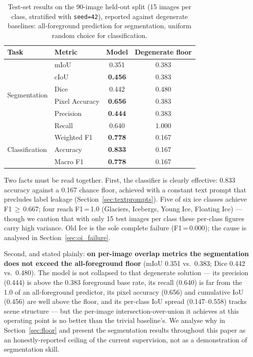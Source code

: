 \documentclass[remotesensing,article,accept,moreauthors,pdftex]{Definitions/mdpi}
\begin{document}
\begin{table}[H]
\centering
\caption{Test-set results on the 90-image held-out split
         (15 images per class, stratified with \texttt{seed=42}), reported
         against degenerate baselines: all-foreground prediction for
         segmentation, uniform random choice for classification.}
\label{tab:main_results}
\begin{tabular}{llcc}
\toprule
\textbf{Task} & \textbf{Metric} & \textbf{Model} & \textbf{Degenerate floor} \\
\midrule
\multirow{6}{*}{Segmentation}
  & mIoU           & 0.351 & 0.383 \\
  & cIoU           & \textbf{0.456} & 0.383 \\
  & Dice           & 0.442 & 0.480 \\
  & Pixel Accuracy & \textbf{0.656} & 0.383 \\
  & Precision      & \textbf{0.444} & 0.383 \\
  & Recall         & 0.640 & 1.000 \\
\midrule
\multirow{3}{*}{Classification}
  & Weighted F1 & \textbf{0.778} & 0.167 \\
  & Accuracy    & \textbf{0.833} & 0.167 \\
  & Macro F1    & \textbf{0.778} & 0.167 \\
\bottomrule
\end{tabular}
\end{table}

\noindent Two facts must be read together. First, the classifier is clearly
effective: 0.833 accuracy against a 0.167 chance floor, achieved with a
constant text prompt that precludes label leakage
(Section~\ref{sec:textprompts}). Five of six ice classes achieve
F1\,$\geq$\,0.667; four reach F1\,=\,1.0 (Glaciers, Icebergs, Young Ice,
Floating Ice) — though we caution that with only 15 test images per class
these per-class figures carry high variance. Old Ice is the sole complete
failure (F1\,=\,0.000); the cause is analysed in Section~\ref{sec:oi_failure}.

Second, and stated plainly: \textbf{on per-image overlap metrics the
segmentation does not exceed the all-foreground floor} (mIoU 0.351 vs.\ 0.383;
Dice 0.442 vs.\ 0.480). The model is not collapsed to that degenerate solution
— its precision (0.444) is above the 0.383 foreground base rate, its recall
(0.640) is far from the 1.0 of an all-foreground predictor, its pixel accuracy
(0.656) and cumulative IoU (0.456) are well above the floor, and its per-class
IoU spread (0.147--0.558) tracks scene structure — but the per-image
intersection-over-union it achieves at this operating point is no better than
the trivial baseline's. We analyse why in Section~\ref{sec:floor} and present
the segmentation results throughout this paper as an honestly-reported
ceiling of the current supervision, not as a demonstration of segmentation
skill.
\end{document}
